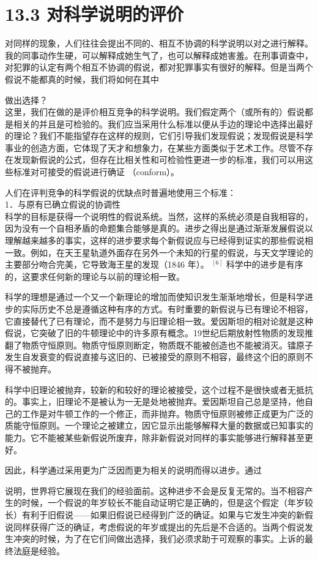 \section*{13.3 对科学说明的评价}
对同样的现象，人们往往会提出不同的、相互不协调的科学说明以对之进行解释。我的同事动作生硬，可以解释成她生气了，也可以解释成她害羞。在刑事调查中，对犯罪的认定有两个相互不协调的假说，都对犯罪事实有很好的解释。但是当两个假说不能都真的时候，我们将如何在其中

做出选择？\\
这里，我们在做的是评价相互竞争的科学说明。我们假定两个（或所有的）假说都是相关的并且是可检验的。我们应当采用什么标准以便从手边的理论中选择出最好的理论？我们不能指望存在这样的规则，它们引导我们发现假说；发现假说是科学事业的创造方面，它体现了天才和想象力，在某些方面类似于艺术工作。尽管不存在发现新假说的公式，但存在比相关性和可检验性更进一步的标准，我们可以用这些标准对可接受的假说进行确证 （conform）。

人们在评判竞争的科学假说的优缺点时普遍地使用三个标准：\\
1．与原有已确立假说的协调性\\
科学的目标是获得一个说明性的假说系统。当然，这样的系统必须是自我相容的，因为没有一个自相矛盾的命题集合能够是真的。进步之得出是通过渐渐发展假说以理解越来越多的事实，这样的进步要求每个新假说应与已经得到证实的那些假说相一致。例如，在天王星轨道外面存在另外一个未知的行星的假说，与天文学理论的主要部分吻合完美，它导致海王星的发现（1846 年）。 ${ }^{[6]}$ 科学中的进步是有序的，这要求任何新的理论与以前的理论相一致。

科学的理想是通过一个又一个新理论的增加而使知识发生渐渐地增长，但是科学进步的实际历史不总是遵循这种有序的方式。有时重要的新假说与已有理论不相容，它直接替代了已有理论，而不是努力与旧理论相一致。爱因斯坦的相对论就是这种假说，它突破了旧的牛顿理论中的许多原有概念。19世纪后期放射性物质的发现推翻了物质守恒原则。物质守恒原则断定，物质既不能被创造也不能被消灭。镭原子发生自发衰变的假说直接与这旧的、已被接受的原则不相容，最终这个旧的原则不得不被抛弃。

科学中旧理论被抛弃，较新的和较好的理论被接受，这个过程不是很快或者无抵抗的。事实上，旧理论不是被认为一无是处地被抛弃。爱因斯坦自己总是坚持，他自己的工作是对牛顿工作的一个修正，而非抛弃。物质守恒原则被修正成更为广泛的质能守恒原则。一个理论之被建立，因它显示出能够解释大量的数据或已知事实的能力。它不能被某些新假说所废弃，除非新假说对同样的事实能够进行解释甚至更好。

因此，科学通过采用更为广泛因而更为相关的说明而得以进步。通过

说明，世界将它展现在我们的经验面前。这种进步不会是反复无常的。当不相容产生的时候，一个假说的年岁较长不能自动证明它是正确的，但是这个假定（年岁较长）有利于旧假说——如果旧假说已经得到广泛的确证。如果与它发生冲突的新假说同样获得广泛的确证，考虑假说的年岁或提出的先后是不合适的。当两个假说发生冲突的时候，为了在它们间做出选择，我们必须求助于可观察的事实。上诉的最终法庭是经验。

